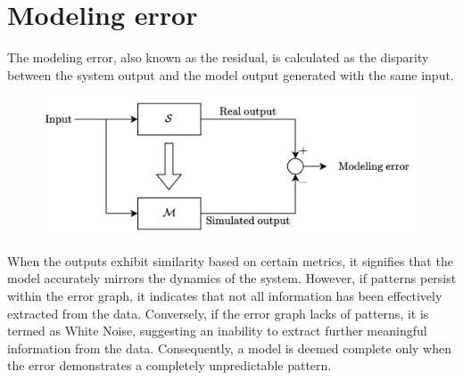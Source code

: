 \section{Modeling error}

The modeling error, also known as the residual, is calculated as the disparity between the system output and the model output generated with the same input.
\begin{figure}[H]
    \centering
    \includegraphics[width=0.7\linewidth]{images/error.png}
\end{figure}
When the outputs exhibit similarity based on certain metrics, it signifies that the model accurately mirrors the dynamics of the system. 
However, if patterns persist within the error graph, it indicates that not all information has been effectively extracted from the data. 
Conversely, if the error graph lacks of patterns, it is termed as White Noise, suggesting an inability to extract further meaningful information from the data.
Consequently, a model is deemed complete only when the error demonstrates a completely unpredictable pattern.